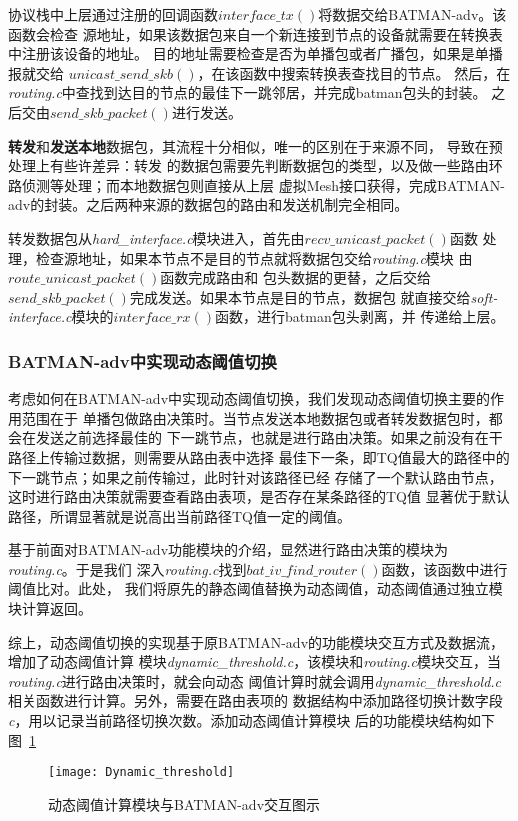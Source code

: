 协议栈中上层通过注册的回调函数$interface\_tx()$将数据交给BATMAN-adv。该函数会检查
源地址，如果该数据包来自一个新连接到节点的设备就需要在转换表中注册该设备的地址。
目的地址需要检查是否为单播包或者广播包，如果是单播报就交给
$unicast\_send\_skb()$，在该函数中搜索转换表查找目的节点。
然后，在\emph{routing.c}中查找到达目的节点的最佳下一跳邻居，并完成batman包头的封装。
之后交由$send\_skb\_packet()$进行发送。

\textbf{转发}和\textbf{发送本地}数据包，其流程十分相似，唯一的区别在于来源不同，
导致在预处理上有些许差异：转发
的数据包需要先判断数据包的类型，以及做一些路由环路侦测等处理；而本地数据包则直接从上层
虚拟Mesh接口获得，完成BATMAN-adv的封装。之后两种来源的数据包的路由和发送机制完全相同。

转发数据包从\emph{hard\_interface.c}模块进入，首先由$recv\_unicast\_packet()$函数
处理，检查源地址，如果本节点不是目的节点就将数据包交给\emph{routing.c}模块
由$route\_unicast\_packet()$函数完成路由和
包头数据的更替，之后交给$send\_skb\_packet()$完成发送。如果本节点是目的节点，数据包
就直接交给\emph{soft-interface.c}模块的$interface\_rx()$函数，进行batman包头剥离，并
传递给上层。

\subsubsection{BATMAN-adv中实现动态阈值切换}
考虑如何在BATMAN-adv中实现动态阈值切换，我们发现动态阈值切换主要的作用范围在于
单播包做路由决策时。当节点发送本地数据包或者转发数据包时，都会在发送之前选择最佳的
下一跳节点，也就是进行路由决策。如果之前没有在干路径上传输过数据，则需要从路由表中选择
最佳下一条，即TQ值最大的路径中的下一跳节点；如果之前传输过，此时针对该路径已经
存储了一个默认路由节点，这时进行路由决策就需要查看路由表项，是否存在某条路径的TQ值
显著优于默认路径，所谓显著就是说高出当前路径TQ值一定的阈值。

基于前面对BATMAN-adv功能模块的介绍，显然进行路由决策的模块为\emph{routing.c}。于是我们
深入\emph{routing.c}找到$bat\_iv\_find\_router()$函数，该函数中进行阈值比对。此处，
我们将原先的静态阈值替换为动态阈值，动态阈值通过独立模块计算返回。

综上，动态阈值切换的实现基于原BATMAN-adv的功能模块交互方式及数据流，增加了动态阈值计算
模块\emph{dynamic\_threshold.c}，该模块和\emph{routing.c}模块交互，当\emph{routing.c}进行路由决策时，就会向动态
阈值计算时就会调用\emph{dynamic\_threshold.c}相关函数进行计算。另外，需要在路由表项的
数据结构中添加路径切换计数字段\emph{c}，用以记录当前路径切换次数。添加动态阈值计算模块
后的功能模块结构如下图~\ref{fig:dynamic_threshold}
\begin{figure}[H] %
  \centering
  \texttt{[image: Dynamic\_threshold]}
  \caption{动态阈值计算模块与BATMAN-adv交互图示}
  \label{fig:dynamic_threshold}
\end{figure}

